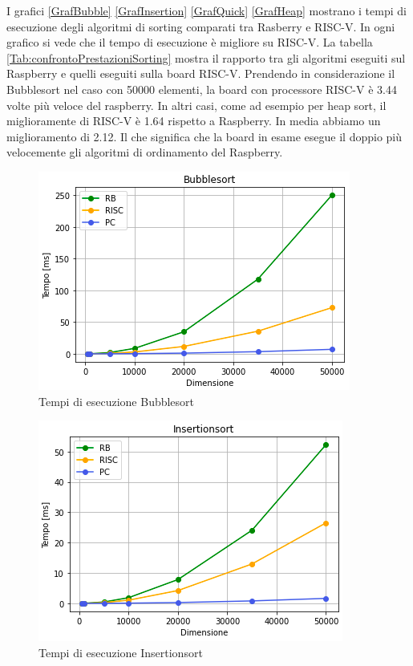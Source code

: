 \documentclass[12pt, a4paper]{report}
\begin{document}
I grafici \ref{GrafBubble} \ref{GrafInsertion} \ref{GrafQuick} \ref{GrafHeap} mostrano i tempi di esecuzione degli algoritmi di sorting comparati tra Rasberry e RISC-V. In ogni grafico si vede che il tempo di esecuzione è migliore su RISC-V. 
La tabella \ref{Tab:confrontoPrestazioniSorting} mostra il rapporto tra gli algoritmi eseguiti sul Raspberry e quelli eseguiti sulla board RISC-V. Prendendo in considerazione il Bubblesort nel caso con 50000 elementi, la board con processore RISC-V è 3.44 volte più veloce del raspberry. In altri casi, come ad esempio per heap sort, il miglioramente di RISC-V è 1.64 rispetto a Raspberry. In media abbiamo un miglioramento di 2.12. Il che significa che la board in esame esegue il doppio più velocemente gli algoritmi di ordinamento del Raspberry.


\begin{figure}[ht]
\centering
 \includegraphics[scale=0.8]{Img/GraficiSorting/Bubblesort_All.PNG}
 \caption{Tempi di esecuzione Bubblesort}
\end{figure}

\begin{figure}[ht]
\centering
 \includegraphics[scale=0.8]{Img/GraficiSorting/Insertionsort_All.PNG}
 \caption{Tempi di esecuzione Insertionsort}
\end{figure}
	
\end{document}

